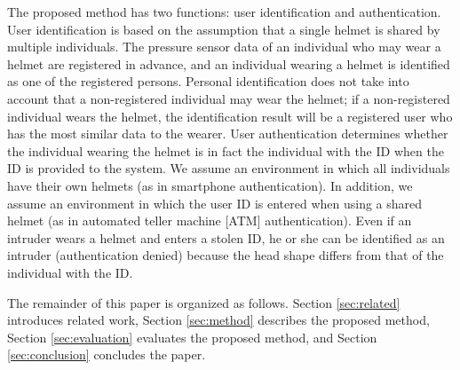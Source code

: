 \documentclass[sigchi,authordraft]{acmart}
\begin{document}
The proposed method has two functions: user identification and authentication. User identification is based on the assumption that a single helmet is shared by multiple individuals. The pressure sensor data of an individual who may wear a helmet are registered in advance, and an individual wearing a helmet is identified as one of the registered persons. Personal identification does not take into account that a non-registered individual may wear the helmet; if a non-registered individual wears the helmet, the identification result will be a registered user who has the most similar data to the wearer. User authentication determines whether the individual wearing the helmet is in fact the individual with the ID when the ID is provided to the system. We assume an environment in which all individuals have their own helmets (as in smartphone authentication). In addition, we assume an environment in which the user ID is entered when using a shared helmet (as in automated teller machine [ATM] authentication). Even if an intruder wears a helmet and enters a stolen ID, he or she can be identified as an intruder (authentication denied) because the head shape differs from that of the individual with the ID.\par

The remainder of this paper is organized as follows. Section \ref{sec:related} introduces related work, Section \ref{sec:method} describes the proposed method, Section \ref{sec:evaluation} evaluates the proposed method, and Section \ref{sec:conclusion} concludes the paper.




\end{document}
